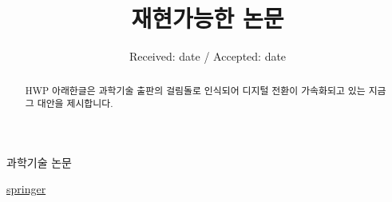 \documentclass[smallextended]{svjour3}       %
\begin{document}
\title{재현가능한 논문 }



\author{  }


\institute{
    }

\date{Received: date / Accepted: date}


\maketitle

\begin{abstract}
HWP 아래한글은 과학기술 출판의 걸림돌로 인식되어 디지털 전환이
가속화되고 있는 지금 그 대안을 제시합니다.
\\


\end{abstract}


\def\spacingset#1{\renewcommand{\baselinestretch}%
{#1}\small\normalsize} \spacingset{1}


과학기술 논문

\href{https://www.e-publications.org/springer/support/spr-chicago.html}{springer}




\end{document}
